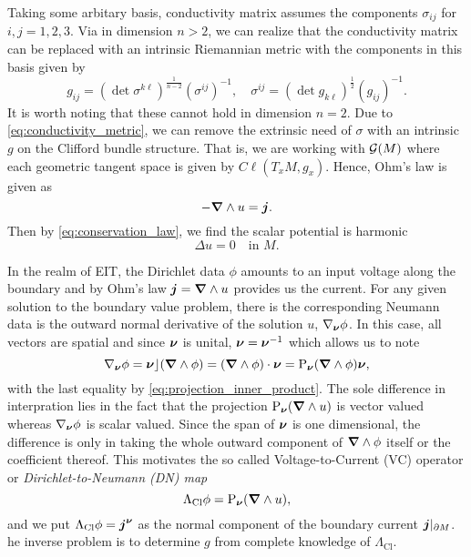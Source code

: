 
Taking some arbitary basis, conductivity matrix assumes the components $\sigma_{ij}$ for $i,j=1,2,3$.  Via \cite{uhlmann_inverse_2014} in dimension $n>2$, we can realize that the conductivity matrix can be replaced with an intrinsic Riemannian metric with the components in this basis given by
\begin{equation}
\label{eq:conductivity_metric}
    g_{ij} = (\det \sigma^{k\ell} )^{\frac{1}{n-2}} (\sigma^{ij})^{-1}, \quad \sigma^{ij} = (\det g_{k\ell})^{\frac{1}{2}} (g_{ij})^{-1}.
\end{equation}
It is worth noting that these cannot hold in dimension $n=2$. Due to \cref{eq:conductivity_metric}, we can remove the extrinsic need of $\sigma$ with an intrinsic $g$ on the Clifford bundle structure. That is, we are working with $\mathcal{G}(M)$ where each geometric tangent space is given by $C\ell(T_xM,g_x)$. Hence, Ohm's law is given as
\begin{equation}
-\boldsymbol{\nabla} \wedge u = \boldsymbol{j}.
\end{equation}
Then by \cref{eq:conservation_law}, we find the scalar potential is harmonic
\begin{equation}
\Delta u = 0 \quad \textrm{in $M$}.
\end{equation}

In the realm of EIT, the Dirichlet data $\phi$ amounts to an input voltage along the boundary and by Ohm's law $\boldsymbol{j}=\boldsymbol{\nabla} \wedge u$ provides us the current. For any given solution to the boundary value problem, there is the corresponding Neumann data is the outward normal derivative of the solution $u$, $\nabla_{\boldsymbol{\nu}} \phi$. In this case, all vectors are spatial and since $\boldsymbol{\nu}$ is unital, $\boldsymbol{\nu}=\boldsymbol{\nu}^{-1}$ which allows us to note
\begin{equation}
\nabla_{\boldsymbol{\nu}} \phi = \boldsymbol{\nu}\rfloor (\boldsymbol{\nabla} \wedge \phi) = (\boldsymbol{\nabla} \wedge \phi) \cdot \boldsymbol{\nu} = \operatorname{P}_{\boldsymbol{\nu}} (\boldsymbol{\nabla} \wedge \phi) \boldsymbol{\nu},
\end{equation}
with the last equality by \cref{eq:projection_inner_product}. The sole difference in interpration lies in the fact that the projection $\operatorname{P}_{\boldsymbol{\nu}}(\boldsymbol{\nabla} \wedge u)$ is vector valued whereas $\nabla_{\boldsymbol{\nu}}\phi$ is scalar valued. Since the span of $\boldsymbol{\nu}$ is one dimensional, the difference is only in taking the whole outward component of $\boldsymbol{\nabla} \wedge \phi$ itself or the coefficient thereof. This motivates the so called Voltage-to-Current (VC) operator or  \emph{Dirichlet-to-Neumann (DN) map}
\begin{equation}
\label{eq:classical_dn_map}
\Lambda_\textrm{Cl} \phi = \operatorname{P}_{\boldsymbol{\nu}}(\boldsymbol{\nabla} \wedge u),
\end{equation}
and we put $\Lambda_{\textrm{Cl}} \phi = \boldsymbol{j}^{\boldsymbol{\nu}}$ as the normal component of the boundary current $\boldsymbol{j}\vert_{{\partial M}}$. he inverse problem is to determine $g$ from complete knowledge of $\Lambda_{\textrm{Cl}}$.


